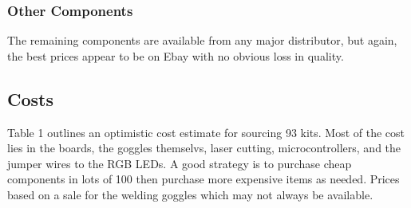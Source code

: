 \documentclass[11pt]{scrartcl}
\begin{document}
\subsubsection{Other Components} The remaining components are available from any major distributor, but again, the best prices appear to be on Ebay with no obvious loss in quality.

\subsection{Costs}
Table 1 outlines an optimistic cost estimate for sourcing 93 kits. Most of the cost lies in the boards, the goggles themselvs, laser cutting, microcontrollers, and the jumper wires to the RGB LEDs. A good strategy is to purchase cheap components in lots of 100 then purchase more expensive items as needed. Prices based on a sale for the welding goggles which may not always be available.
\end{document}
